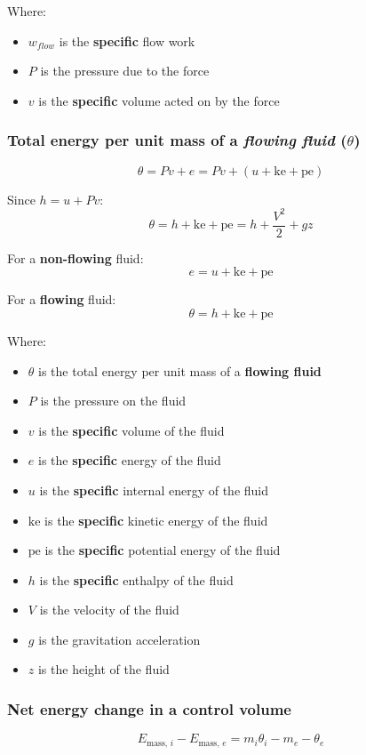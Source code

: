 \documentclass[11pt]{article}
\begin{document}
Where:
\begin{itemize}
\item \(w_{flow}\) is the \textbf{specific} flow work
\item \(P\) is the pressure due to the force
\item \(v\) is the \textbf{specific} volume acted on by the force
\end{itemize}
\subsubsection{Total energy per unit mass of a \emph{flowing fluid} (\(\theta\))}
\label{sec:orgf48b46c}
\[\theta = Pv + e = Pv + (u + \text{ke} + \text{pe})\]

Since \(h = u + Pv\):
\[\theta = h + \text{ke} + \text{pe} = h + \frac{V^2}{2} + gz\]

For a \textbf{non-flowing} fluid:
\[e = u + \text{ke} + \text{pe}\]

For a \textbf{flowing} fluid:
\[\theta = h + \text{ke} + \text{pe}\]

Where:
\begin{itemize}
\item \(\theta\) is the total energy per unit mass of a \textbf{flowing fluid}
\item \(P\) is the pressure on the fluid
\item \(v\) is the \textbf{specific} volume of the fluid
\item \(e\) is the \textbf{specific} energy of the fluid
\item \(u\) is the \textbf{specific} internal energy of the fluid
\item \(\text{ke}\) is the \textbf{specific} kinetic energy of the fluid
\item \(\text{pe}\) is the \textbf{specific} potential energy of the fluid
\item \(h\) is the \textbf{specific} enthalpy of the fluid
\item \(V\) is the velocity of the fluid
\item \(g\) is the gravitation acceleration
\item \(z\) is the height of the fluid
\end{itemize}
\subsubsection{Net energy change in a control volume}
\label{sec:org091afe8}
\[E_{\text{mass, } i} - E_{\text{mass, } e} = m_i \theta_i - m_e - \theta_e\]
\end{document}

